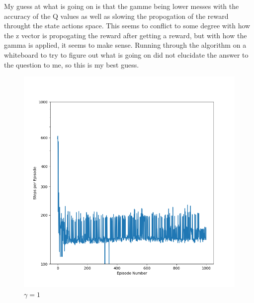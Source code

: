 \documentclass{article}
\begin{document}
\begin{enumerate}
\begin{enumerate}
        My guess at what is going on is that the gamme being lower messes with the accuracy of the Q values as well as slowing the propogation of the
        reward throught the state actions space. This seems to conflict to some degree with how the z vector is propogating the reward after getting a
        reward, but with how the gamma is applied, it seems to make sense. Running through the algorithm on a whiteboard to try to figure out what 
        is going on did not elucidate the answer to the question to me, so this is my best guess. 

        \begin{center}
    \begin{figure}[h]
        \centerline{\includegraphics[width=\linewidth]{images/gamma0.png}}
            \caption{ $\gamma = 1 $ }
        \endminipage

\end{figure}
\end{center}
\end{enumerate}
\end{enumerate}
\end{document}
